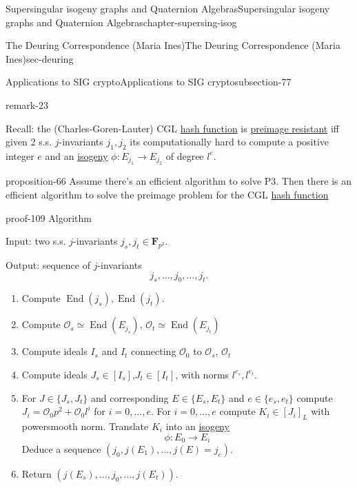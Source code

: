 \documentclass[oneside,10pt,]{book}
\numberwithin{equation}{section}
\newcommand{\lb}{[}
\newcommand{\rb}{]}
\newcommand{\FF}{\mathbf{F}}
\newcommand{\ints}{\mathcal{O}}
\DeclareMathOperator{\End}{End}
\begin{document}
\begin{chapterptx}{Supersingular isogeny graphs and Quaternion Algebras}{}{Supersingular isogeny graphs and Quaternion Algebras}{}{}{chapter-supersing-isog}
\begin{sectionptx}{The Deuring Correspondence (Maria Ines)}{}{The Deuring Correspondence (Maria Ines)}{}{}{sec-deuring}
\begin{subsectionptx}{Applications to SIG crypto}{}{Applications to SIG crypto}{}{}{subsection-77}
\begin{remark}{}{remark-23}
\begin{enumerate}
\end{enumerate}
%
\end{remark}
\hypertarget{p-976}{}%
Recall: the (Charles-Goren-Lauter) CGL \hyperref[def-hash-function]{hash function} is \hyperref[def-preimage-resistance]{preimage resistant} iff given 2 s.s. \(j\)-invariants \(j_1,j_2\) its computationally hard to compute a  positive integer \(e\) and an \hyperref[def-supersing-isog-isog]{isogeny} \(\phi \colon E_{j_1} \to E_{j_2}\) of degree \(l^e\).%
\begin{proposition}{}{}{proposition-66}%
\hypertarget{p-977}{}%
Assume there's an efficient algorithm to solve P3. Then there is an efficient algorithm to solve the preimage problem for the CGL \hyperref[def-hash-function]{hash function}%
\end{proposition}
\begin{proofptx}{}{proof-109}
\hypertarget{p-978}{}%
Algorithm%
\par
\hypertarget{p-979}{}%
Input: two s.s. \(j\)-invariants \(j_s,j_t \in \FF_{p^2}\).%
\par
\hypertarget{p-980}{}%
Output: sequence of \(j\)-invariants%
\begin{equation*}
j_s,\ldots,j_0,\ldots, j_t\text{.}
\end{equation*}
%
\par
\hypertarget{p-981}{}%
\leavevmode%
\begin{enumerate}
\item\hypertarget{li-243}{}Compute \(\End(j_s),\End(j_t)\).%
\item\hypertarget{li-244}{}Compute \(\ints_s \simeq \End(E_{j_s})\), \(\ints_t \simeq \End(E_{j_t})\)%
\item\hypertarget{li-245}{}Compute ideals \(I_s\) and \(I_t\) connecting \(\ints_0 \) to \(\ints_s\), \(\ints_t\)%
\item\hypertarget{li-246}{}Compute ideals \(J_s \in \lb I_s \rb\),\(J_t \in \lb I_t \rb\), with norms \(l^{e_s},l^{e_t}\).%
\item\hypertarget{li-247}{}For \(J \in \{J_s,J_t\}\) and corresponding \(E \in \{E_s,E_t\}\) and \(e\in \{e_s, e_t\}\) compute \(J_i = \ints_0 p^2 + \ints_0 l^i\) for \(i = 0,\ldots, e\). For \(i = 0,\ldots, e\) compute \(K_i \in \lb J_i \rb_L\) with powersmooth norm. Translate \(K_i\) into an \hyperref[def-supersing-isog-isog]{isogeny}%
\begin{equation*}
\phi\colon E_0 \to E_i
\end{equation*}
Deduce a sequence \((j_0, j(E_1),\ldots,j(E) = j_e)\).%
\item\hypertarget{li-248}{}Return \((j(E_s), \ldots,j_0, \ldots,j(E_t))\).%

\end{enumerate}
\end{proofptx}
\end{subsectionptx}
\end{sectionptx}
\end{chapterptx}
\end{document}
